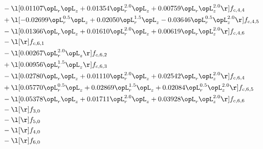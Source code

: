 \begin{alignat}{2}
& - \l[  0.01107 \opL_r \opL_z +  0.01354 \opL_r^{2.0} \opL_z +  0.00759 \opL_r \opL_z^{2.0}  \r] f_{c,4,4} \nonumber \\ 
& + \l[  -0.02699 \opL_r^{0.5} \opL_z +  0.02050 \opL_r^{1.5} \opL_z   -0.03646 \opL_r^{0.5} \opL_z^{2.0}  \r] f_{c,4,5} \nonumber \\ 
& - \l[  0.01366 \opL_r \opL_z +  0.01610 \opL_r^{2.0} \opL_z +  0.00619 \opL_r \opL_z^{2.0}  \r] f_{c,4,6} \nonumber \\ 
& - \l[  \r] f_{c,6,1} \nonumber \\ 
& - \l[  0.00267 \opL_r^{2.0} \opL_z  \r] f_{c,6,2} \nonumber \\ 
& + \l[  0.00956 \opL_r^{1.5} \opL_z  \r] f_{c,6,3} \nonumber \\ 
& - \l[  0.02780 \opL_r \opL_z +  0.01110 \opL_r^{2.0} \opL_z +  0.02542 \opL_r \opL_z^{2.0}  \r] f_{c,6,4} \nonumber \\ 
& + \l[  0.05770 \opL_r^{0.5} \opL_z +  0.02869 \opL_r^{1.5} \opL_z +  0.02084 \opL_r^{0.5} \opL_z^{2.0}  \r] f_{c,6,5} \nonumber \\ 
& - \l[  0.05378 \opL_r \opL_z +  0.01711 \opL_r^{2.0} \opL_z +  0.03928 \opL_r \opL_z^{2.0}  \r] f_{c,6,6} \nonumber \\ 
& - \l[  \r] f_{3,0} \nonumber \\ 
& - \l[  \r] f_{5,0} \nonumber \\ 
& - \l[  \r] f_{4,0} \nonumber \\ 
& - \l[  \r] f_{6,0} \nonumber \\ 
\end{alignat} 


